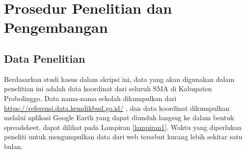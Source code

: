\section{Prosedur Penelitian dan Pengembangan}


\subsection{Data Penelitian}
    
Berdasarkan studi kasus dalam skripsi ini, data yang akan digunakan dalam penelitian ini adalah data koordinat dari seluruh SMA di Kabupaten Probolinggo. Data nama-nama sekolah dikumpulkan dari \url{https://referensi.data.kemdikbud.go.id/} \cite{kemendikbud}, dan data koordinat dikumpulkan melalui aplikasi Google Earth yang dapat diunduh langsug ke dalam bentuk spreadsheet, dapat dilihat pada Lampiran \ref{lampiran1}. Waktu yang diperlukan peneliti untuk mengumpulkan data dari web tersebut kurang lebih sekitar satu bulan.

